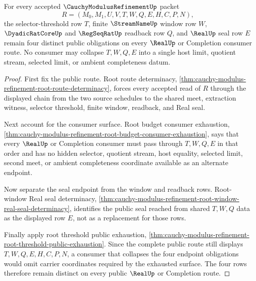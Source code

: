 \begin{theorem}
\label{thm:cauchy-modulus-refinement-root-threshold-seal-endpoint-separation}
For every accepted $\CauchyModulusRefinementUp$ packet
$$
R=(M_0,M_1,U,V,T,W,Q,E,H,C,P,N),
$$
the selector-threshold row $T$, finite $\StreamNameUp$ window row $W$, $\DyadicRatCoreUp$ and $\RegSeqRatUp$ readback row $Q$, and $\RealUp$ seal row $E$ remain four distinct public obligations on every $\RealUp$ or Completion consumer route. No consumer may collapse $T,W,Q,E$ into a single host limit, quotient stream, selected limit, or ambient completeness datum.
\end{theorem}
\begin{proof}
First fix the public route. Root route determinacy, \autoref{thm:cauchy-modulus-refinement-root-route-determinacy}, forces every accepted read of $R$ through the displayed chain from the two source schedules to the shared meet, extraction witness, selector threshold, finite window, readback, and Real seal.

Next account for the consumer surface. Root budget consumer exhaustion, \autoref{thm:cauchy-modulus-refinement-root-budget-consumer-exhaustion}, says that every $\RealUp$ or Completion consumer must pass through $T,W,Q,E$ in that order and has no hidden selector, quotient stream, host equality, selected limit, second meet, or ambient completeness coordinate available as an alternate endpoint.

Now separate the seal endpoint from the window and readback rows. Root-window Real seal determinacy, \autoref{thm:cauchy-modulus-refinement-root-window-real-seal-determinacy}, identifies the public seal reached from shared $T,W,Q$ data as the displayed row $E$, not as a replacement for those rows.

Finally apply root threshold public exhaustion, \autoref{thm:cauchy-modulus-refinement-root-threshold-public-exhaustion}. Since the complete public route still displays $T,W,Q,E,H,C,P,N$, a consumer that collapses the four endpoint obligations would omit carrier coordinates required by the exhausted surface. The four rows therefore remain distinct on every public $\RealUp$ or Completion route.
\end{proof}

